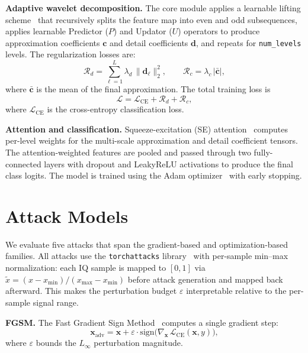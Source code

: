 \textbf{Adaptive wavelet decomposition.}
The core module applies a learnable lifting scheme~\cite{li2023awn} that
recursively splits the feature map into even and odd subsequences, applies
learnable Predictor ($P$) and Updator ($U$) operators to produce
approximation coefficients $\mathbf{c}$ and detail coefficients $\mathbf{d}$,
and repeats for \texttt{num\_levels} levels. The regularization losses are:
\begin{equation}
  \mathcal{R}_d = \sum_{\ell=1}^{L} \lambda_d \,\|\mathbf{d}_\ell\|_2^2,
  \qquad
  \mathcal{R}_c = \lambda_c \,|\bar{\mathbf{c}}|,
\end{equation}
where $\bar{\mathbf{c}}$ is the mean of the final approximation. The total
training loss is
\begin{equation}
  \mathcal{L} = \mathcal{L}_{\mathrm{CE}} + \mathcal{R}_d + \mathcal{R}_c,
\end{equation}
where $\mathcal{L}_{\mathrm{CE}}$ is the cross-entropy classification loss.

\textbf{Attention and classification.}
Squeeze-excitation (SE) attention~\cite{hu2018squeeze} computes per-level
weights for the multi-scale approximation and detail coefficient tensors.
The attention-weighted features are pooled and passed through two
fully-connected layers with dropout and LeakyReLU activations to produce the
final class logits. The model is trained using the Adam
optimizer~\cite{kingma2015adam} with early stopping.

\section{Attack Models}

We evaluate five attacks that span the gradient-based and optimization-based
families. All attacks use the \texttt{torchattacks}
library~\cite{kim2020torchattacks} with per-sample min--max normalization:
each IQ sample is mapped to $[0, 1]$ via
$\tilde{x} = (x - x_{\min}) / (x_{\max} - x_{\min})$ before attack generation
and mapped back afterward. This makes the perturbation budget $\varepsilon$
interpretable relative to the per-sample signal range.

\textbf{FGSM.}
The Fast Gradient Sign Method~\cite{goodfellow2015fgsm} computes a single
gradient step:
\begin{equation}
  \mathbf{x}_{\mathrm{adv}} = \mathbf{x} + \varepsilon \cdot
    \mathrm{sign}\!\bigl(\nabla_{\mathbf{x}}\,\mathcal{L}_{\mathrm{CE}}
    (\mathbf{x}, y)\bigr),
\end{equation}
where $\varepsilon$ bounds the $L_\infty$ perturbation magnitude.


